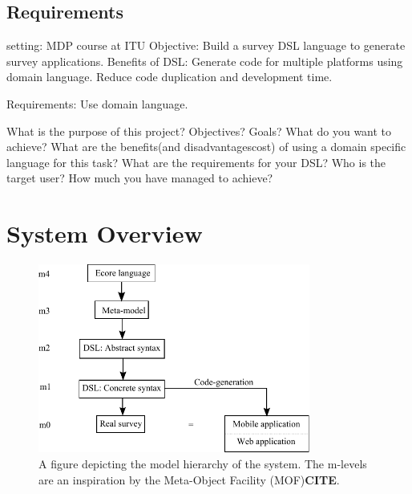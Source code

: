 \documentclass[runningheads]{llncs}
\begin{document}
\subsection{Requirements}

setting: MDP course at ITU
Objective: Build a survey DSL language to generate survey applications.
Benefits of DSL: Generate code for multiple platforms using domain language. Reduce code duplication and development time.

Requirements: Use domain language. 



What is the purpose of this project?
Objectives? Goals? What do you want to achieve?
What are the benefits(and disadvantages\/cost) of using a domain
specific language for this task?
What are the requirements for your DSL? Who is the target user?
How much you have managed to achieve?

\section{System Overview}
\begin{figure}
\centering
\includegraphics[height=6.2cm]{modelhierarchy}
\caption{A figure depicting the model hierarchy of the system. The m-levels are an inspiration by the Meta-Object Facility (MOF)\textbf{CITE}.}
\label{fig:mhier}
\end{figure}
\end{document}
